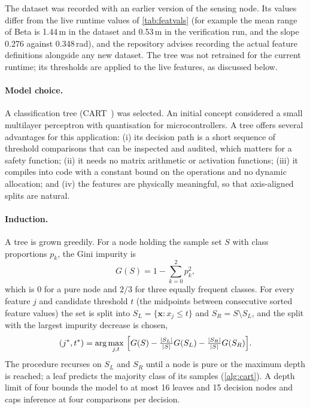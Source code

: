 \documentclass[11pt,a4paper]{article}
\newcommand{\vect}[1]{\bm{#1}}
\begin{document}
\noindent
The dataset was recorded with an earlier version of the sensing node. Its values differ from the live runtime values of \cref{tab:featvals} (for example the mean range of Beta is 1.44\,m in the dataset and 0.53\,m in the verification run, and the slope 0.276 against 0.348\,rad), and the repository advises recording the actual feature definitions alongside any new dataset. The tree was not retrained for the current runtime; its thresholds are applied to the live features, as discussed below.
 
\paragraph{Model choice.} A classification tree (CART~\cite{cart}) was selected. An initial concept considered a small multilayer perceptron with quantisation for microcontrollers. A tree offers several advantages for this application: (i) its decision path is a short sequence of threshold comparisons that can be inspected and audited, which matters for a safety function; (ii) it needs no matrix arithmetic or activation functions; (iii) it compiles into code with a constant bound on the operations and no dynamic allocation; and (iv) the features are physically meaningful, so that axis-aligned splits are natural.
 
\paragraph{Induction.} A tree is grown greedily. For a node holding the sample set $S$ with class proportions $p_k$, the Gini impurity is
\begin{equation}
G(S)=1-\sum_{k=0}^{2}p_k^2 ,
\end{equation}
which is $0$ for a pure node and $2/3$ for three equally frequent classes. For every feature $j$ and candidate threshold $t$ (the midpoints between consecutive sorted feature values) the set is split into $S_L=\{\vect x:x_j\le t\}$ and $S_R=S\setminus S_L$, and the split with the largest impurity decrease is chosen,
\begin{equation}
(j^\ast,t^\ast)=\arg\max_{j,t}\ \Bigl[G(S)-\tfrac{|S_L|}{|S|}G(S_L)-\tfrac{|S_R|}{|S|}G(S_R)\Bigr].
\label{eq:gini}
\end{equation}
The procedure recurses on $S_L$ and $S_R$ until a node is pure or the maximum depth is reached; a leaf predicts the majority class of its samples (\cref{alg:cart}). A depth limit of four bounds the model to at most 16 leaves and 15 decision nodes and caps inference at four comparisons per decision.
 
\end{document}
